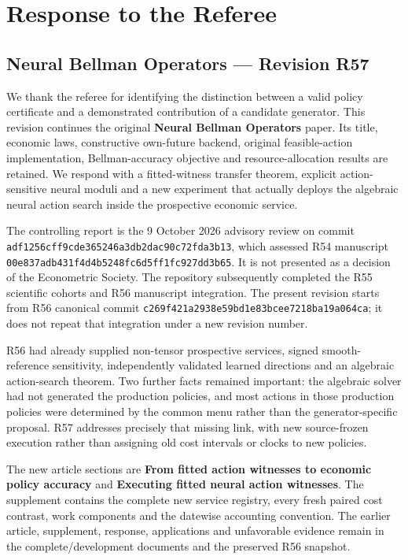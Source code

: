 \hypertarget{response-to-the-referee}{%
\section{Response to the Referee}\label{response-to-the-referee}}

\hypertarget{neural-bellman-operators-revision-r57}{%
\subsection{Neural Bellman Operators --- Revision
R57}\label{neural-bellman-operators-revision-r57}}

We thank the referee for identifying the distinction between a valid
policy certificate and a demonstrated contribution of a candidate
generator. This revision continues the original \textbf{Neural Bellman
Operators} paper. Its title, economic laws, constructive own-future
backend, original feasible-action implementation, Bellman-accuracy
objective and resource-allocation results are retained. We respond with
a fitted-witness transfer theorem, explicit action-sensitive neural
moduli and a new experiment that actually deploys the algebraic neural
action search inside the prospective economic service.

The controlling report is the 9 October 2026 advisory review on commit
\texttt{adf1256cff9cde365246a3db2dac90c72fda3b13}, which assessed R54
manuscript \texttt{00e837adb431f4d4b5248fc6d5ff1fc927dd3b65}. It is not
presented as a decision of the Econometric Society. The repository
subsequently completed the R55 scientific cohorts and R56 manuscript
integration. The present revision starts from R56 canonical commit
\texttt{c269f421a2938e59bd1e83bcee7218ba19a064ca}; it does not repeat
that integration under a new revision number.

R56 had already supplied non-tensor prospective services, signed
smooth-reference sensitivity, independently validated learned directions
and an algebraic action-search theorem. Two further facts remained
important: the algebraic solver had not generated the production
policies, and most actions in those production policies were determined
by the common menu rather than the generator-specific proposal. R57
addresses precisely that missing link, with new source-frozen execution
rather than assigning old cost intervals or clocks to new policies.

The new article sections are \textbf{From fitted action witnesses to
economic policy accuracy} and \textbf{Executing fitted neural action
witnesses}. The supplement contains the complete new service registry,
every fresh paired cost contrast, work components and the datewise
accounting convention. The earlier article, supplement, response,
applications and unfavorable evidence remain in the complete/development
documents and the preserved R56 snapshot.

